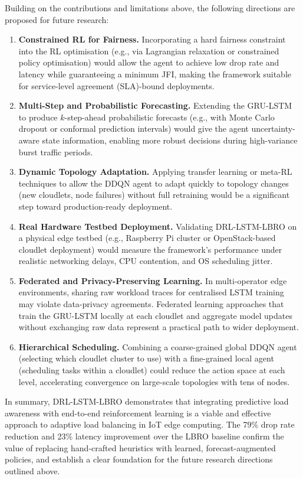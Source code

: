 Building on the contributions and limitations above, the
following directions are proposed for future research:

\begin{enumerate}

  \item \textbf{Constrained RL for Fairness.}
  Incorporating a hard fairness constraint into the RL
  optimisation (e.g., via Lagrangian relaxation or
  constrained policy optimisation) would allow the agent
  to achieve low drop rate and latency while guaranteeing
  a minimum JFI, making the framework suitable for
  service-level agreement (SLA)-bound deployments.

  \item \textbf{Multi-Step and Probabilistic Forecasting.}
  Extending the GRU-LSTM to produce $k$-step-ahead
  probabilistic forecasts (e.g., with Monte Carlo dropout
  or conformal prediction intervals) would give the agent
  uncertainty-aware state information, enabling more robust
  decisions during high-variance burst traffic periods.

  \item \textbf{Dynamic Topology Adaptation.}
  Applying transfer learning or meta-RL techniques to
  allow the DDQN agent to adapt quickly to topology
  changes (new cloudlets, node failures) without
  full retraining would be a significant step toward
  production-ready deployment.

  \item \textbf{Real Hardware Testbed Deployment.}
  Validating DRL-LSTM-LBRO on a physical edge testbed
  (e.g., Raspberry Pi cluster or OpenStack-based cloudlet
  deployment) would measure the framework's performance
  under realistic networking delays, CPU contention, and
  OS scheduling jitter.

  \item \textbf{Federated and Privacy-Preserving Learning.}
  In multi-operator edge environments, sharing raw
  workload traces for centralised LSTM training may
  violate data-privacy agreements. Federated learning
  approaches that train the GRU-LSTM locally at each
  cloudlet and aggregate model updates without exchanging
  raw data represent a practical path to wider deployment.

  \item \textbf{Hierarchical Scheduling.}
  Combining a coarse-grained global DDQN agent (selecting
  which cloudlet cluster to use) with a fine-grained
  local agent (scheduling tasks within a cloudlet) could
  reduce the action space at each level, accelerating
  convergence on large-scale topologies with tens of nodes.

\end{enumerate}

In summary, DRL-LSTM-LBRO demonstrates that integrating
predictive load awareness with end-to-end reinforcement
learning is a viable and effective approach to adaptive
load balancing in IoT edge computing. The 79\% drop rate
reduction and 23\% latency improvement over the LBRO
baseline confirm the value of replacing hand-crafted
heuristics with learned, forecast-augmented policies, and
establish a clear foundation for the future research
directions outlined above.
